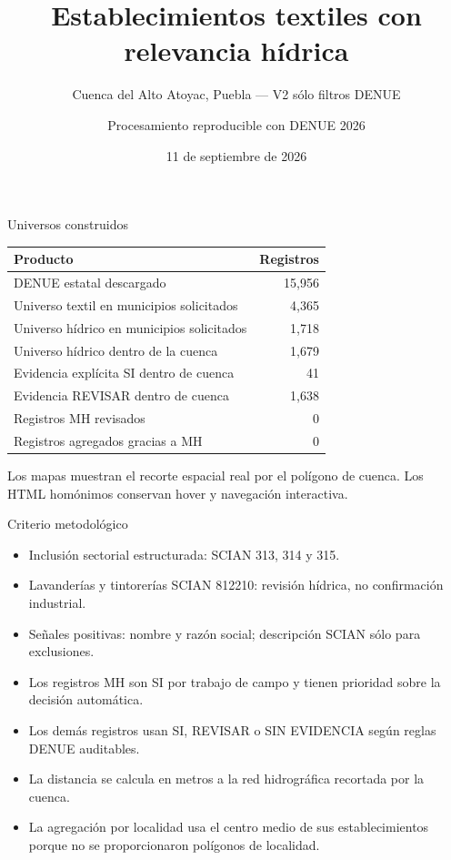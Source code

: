 \documentclass[aspectratio=169]{beamer}
\title{Establecimientos textiles con relevancia hídrica}
\subtitle{Cuenca del Alto Atoyac, Puebla — V2 sólo filtros DENUE}
\author{Procesamiento reproducible con DENUE 2026}
\date{11 de septiembre de 2026}
\begin{document}
\begin{frame}\titlepage\end{frame}
\begin{frame}{Universos construidos}
\centering
\begin{tabular}{lr}\toprule
Producto & Registros\\\midrule
DENUE estatal descargado & 15,956\\
Universo textil en municipios solicitados & 4,365\\
Universo hídrico en municipios solicitados & 1,718\\
Universo hídrico dentro de la cuenca & 1,679\\
Evidencia explícita SI dentro de cuenca & 41\\
Evidencia REVISAR dentro de cuenca & 1,638\\
Registros MH revisados & 0\\
Registros agregados gracias a MH & 0\\
\bottomrule\end{tabular}
\vfill
Los mapas muestran el recorte espacial real por el polígono de cuenca. Los HTML homónimos conservan hover y navegación interactiva.
\end{frame}
\begin{frame}{Criterio metodológico}
\begin{itemize}
\item Inclusión sectorial estructurada: SCIAN 313, 314 y 315.
\item Lavanderías y tintorerías SCIAN 812210: revisión hídrica, no confirmación industrial.
\item Señales positivas: nombre y razón social; descripción SCIAN sólo para exclusiones.
\item Los registros MH son SI por trabajo de campo y tienen prioridad sobre la decisión automática.
\item Los demás registros usan SI, REVISAR o SIN EVIDENCIA según reglas DENUE auditables.
\item La distancia se calcula en metros a la red hidrográfica recortada por la cuenca.
\item La agregación por localidad usa el centro medio de sus establecimientos porque no se proporcionaron polígonos de localidad.
\end{itemize}
\end{frame}
\end{document}
